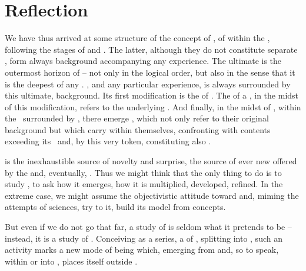 %
\section{Reflection}\label{se:reflection}

\pa We have thus arrived at some structure of the concept of , of
 within the \hoa, following the stages of  and
.  The latter, although they do not constitute separate
, form always  background accompanying any
experience.  The ultimate  is the outermost horizon of
 -- not only in the logical order, but also in the sense that it
is the deepest  of any .  , and any
particular experience, is always surrounded by this ultimate, 
background.  Its first modification is the  of .  The
 of a , in the midst of this
 modification, refers to the underlying .  And
finally, in the midst of , within the \hoa\ surrounded by
, there emerge ,  which not only
refer to their original background but which carry  within
themselves, confronting  with contents exceeding its \hoa\ and, by
this very token, constituting also .

\pa {} is the inexhaustible source of novelty and surprise, the
source of ever new  offered by the  and, eventually,
. Thus we might think that the only thing to do is to study
, to ask how it emerges, how it is multiplied, developed,
refined. In the extreme case, we might assume the {objectivistic attitude}
toward  and, miming the attempts of sciences, try to
 it, build its model from  concepts.

But even if we do not go that far, a study of  is seldom what it
pretends to be -- instead, it is a study of .  Conceiving
 as a series, a  of ,
splitting  into  , such an
activity marks a new mode of being which, emerging from and, so to speak, within
or into , places itself outside .

